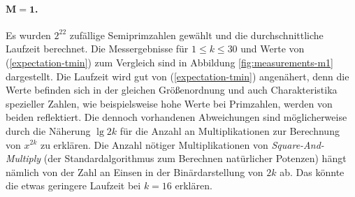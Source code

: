 \documentclass[a4paper, 10pt, ngerman]{article}
\begin{document}
    \paragraph{$\bm{M = 1}$.} Es wurden $2^{22}$ zufällige Semiprimzahlen gewählt und die durchschnittliche Laufzeit berechnet. Die Messergebnisse für $1 \le k \le 30$ und Werte von (\ref{expectation-tmin}) zum Vergleich sind in Abbildung \ref{fig:measurements-m1} dargestellt. Die Laufzeit wird gut von (\ref{expectation-tmin}) angenähert, denn die Werte befinden sich in der gleichen Größenordnung und auch Charakteristika spezieller Zahlen, wie beispielsweise hohe Werte bei Primzahlen, werden von beiden reflektiert. Die dennoch vorhandenen Abweichungen sind möglicherweise durch die Näherung $\lg 2k$ für die Anzahl an Multiplikationen zur Berechnung von $x^{2k}$ zu erklären. Die Anzahl nötiger Multiplikationen von \emph{Square-And-Multiply} (der Standardalgorithmus zum Berechnen natürlicher Potenzen) hängt nämlich von der Zahl an Einsen in der Binärdarstellung von $2k$ ab. Das könnte die etwas geringere Laufzeit bei $k = 16$ erklären.
\end{document}
